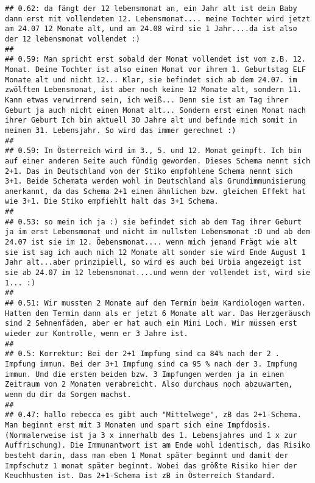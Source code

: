 \documentclass[
]{book}
\begin{document}
\begin{verbatim}
## 0.62: da fängt der 12 lebensmonat an, ein Jahr alt ist dein Baby dann erst mit vollendetem 12. Lebensmonat.... meine Tochter wird jetzt am 24.07 12 Monate alt, und am 24.08 wird sie 1 Jahr....da ist also der 12 lebensmonat vollendet :)
## 
## 0.59: Man spricht erst sobald der Monat vollendet ist vom z.B. 12. Monat. Deine Tochter ist also einen Monat vor ihrem 1. Geburtstag ELF Monate alt und nicht 12... Klar, sie befindet sich ab dem 24.07. im zwölften Lebensmonat, ist aber noch keine 12 Monate alt, sondern 11. Kann etwas verwirrend sein, ich weiß... Denn sie ist am Tag ihrer Geburt ja auch nicht einen Monat alt... Sondern erst einen Monat nach ihrer Geburt Ich bin aktuell 30 Jahre alt und befinde mich somit in meinem 31. Lebensjahr. So wird das immer gerechnet :)
## 
## 0.59: In Österreich wird im 3., 5. und 12. Monat geimpft. Ich bin auf einer anderen Seite auch fündig geworden. Dieses Schema nennt sich 2+1. Das in Deutschland von der Stiko empfohlene Schema nennt sich 3+1. Beide Schemata werden wohl in Deutschland als Grundimmunisierung anerkannt, da das Schema 2+1 einen ähnlichen bzw. gleichen Effekt hat wie 3+1. Die Stiko empfiehlt halt das 3+1 Schema.
## 
## 0.53: so mein ich ja :) sie befindet sich ab dem Tag ihrer Geburt ja im erst Lebensmonat und nicht im nullsten Lebensmonat :D und ab dem 24.07 ist sie im 12. Öebensmonat.... wenn mich jemand Frägt wie alt sie ist sag ich auch nich 12 Monate alt sonder sie wird Ende August 1 Jahr alt...aber prinzipiell, so wird es auch bei Urbia angezeigt ist sie ab 24.07 im 12 lebensmonat....und wenn der vollendet ist, wird sie 1... :)
## 
## 0.51: Wir mussten 2 Monate auf den Termin beim Kardiologen warten. Hatten den Termin dann als er jetzt 6 Monate alt war. Das Herzgeräusch sind 2 Sehnenfäden, aber er hat auch ein Mini Loch. Wir müssen erst wieder zur Kontrolle, wenn er 3 Jahre ist.
## 
## 0.5: Korrektur: Bei der 2+1 Impfung sind ca 84% nach der 2 . Impfung immun. Bei der 3+1 Impfung sind ca 95 % nach der 3. Impfung immun. Und die ersten beiden bzw. 3 Impfungen werden ja in einen Zeitraum von 2 Monaten verabreicht. Also durchaus noch abzuwarten, wenn du dir da Sorgen machst.
## 
## 0.47: hallo rebecca es gibt auch "Mittelwege", zB das 2+1-Schema. Man beginnt erst mit 3 Monaten und spart sich eine Impfdosis. (Normalerweise ist ja 3 x innerhalb des 1. Lebensjahres und 1 x zur Auffrischung). Die Immunantwort ist am Ende wohl identisch, das Risiko besteht darin, dass man eben 1 Monat später beginnt und damit der Impfschutz 1 monat später beginnt. Wobei das größte Risiko hier der Keuchhusten ist. Das 2+1-Schema ist zB in Österreich Standard.

\end{verbatim}
\end{document}
